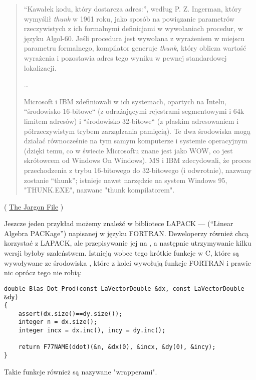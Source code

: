 \begin{framed}
\begin{quotation}
“Kawałek kodu, który dostarcza adres:”, według P. Z. Ingerman,
który wymyślił \emph{thunk} w 1961 roku, jako sposób na powiązanie parametrów rzeczywistych z ich formalnymi
definicjami w wywołaniach procedur, w języku Algol-60. Jeśli procedura jest wywołana z wyrażeniem
w miejscu parametru formalnego, kompilator generuje \emph{thunk}, który oblicza
wartość wyrażenia i pozostawia adres tego wyniku w pewnej standardowej lokalizacji.

\dots

Microsoft i IBM zdefiniowali w ich systemach, opartych na Intelu, “środowisko 16-bitowe“
(z odrażającymi rejestrami segmentowymi i 64k limitem adresów) i “środowisko 32-bitowe“
(z płaskim adresowaniem i półrzeczywistym trybem zarządzania pamięcią). Te dwa środowiska mogą
działać równocześnie na tym samym komputerze i systemie operacyjnym (dzięki temu, co w świecie Microsoftu znane jest jako WOW, co jest skrótowcem od Windows On Windows). MS i IBM zdecydowali, że proces przechodzenia
z trybu 16-bitowego do 32-bitowego (i odwrotnie), nazwany zostanie “thunk”; istnieje nawet
narzędzie na system Windows 95, "THUNK.EXE", nazwane "thunk kompilatorem".
\end{quotation}
\end{framed}
( \href{http://go.yurichev.com/17362}{The Jargon File} )

Jeszcze jeden przykład możemy znaleźć w bibliotece LAPACK --- (``Linear Algebra PACKage'') napisanej w języku FORTRAN.
Deweloperzy \CCpp również chcą korzystać z LAPACK, ale przepisywanie jej na \CCpp, a następnie utrzymywanie kilku wersji byłoby szaleństwem.
Istnieją wobec tego krótkie funkcje w C, które są wywoływane ze środowiska \CCpp{}, które z kolei wywołują funkcje FORTRAN i prawie nic oprócz tego nie robią:

\begin{lstlisting}[style=customc]
double Blas_Dot_Prod(const LaVectorDouble &dx, const LaVectorDouble &dy)
{
    assert(dx.size()==dy.size());
    integer n = dx.size();
    integer incx = dx.inc(), incy = dy.inc();

    return F77NAME(ddot)(&n, &dx(0), &incx, &dy(0), &incy);
}
\end{lstlisting}

Takie funkcje również są nazywane "wrapperami".


